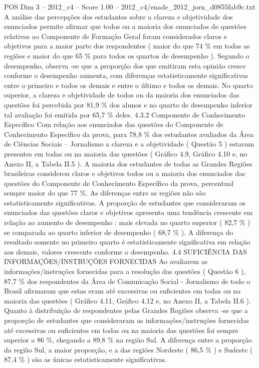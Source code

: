 \begin{textsample}{POS Dim 3 – 2012\_c4 – Score 1.00 – 2012\_c4/enade\_2012\_jorn\_d0855fab9c.txt}
A análise das percepções dos estudantes sobre a clareza e objetividade dos enunciados permite afirmar que todos ou a maioria dos enunciados de questões relativas ao Componente de Formação Geral foram considerados claros e objetivos para a maior parte dos respondentes ( maior do que 74 \% em todas as regiões e maior do que 65 \% para todos os quartos de desempenho ).
Segundo o desempenho, observa -se que a proporção dos que emitiram esta opinião cresce conforme o desempenho aumenta, com diferenças estatisticamente significativas entre o primeiro e todos os demais e entre o último e todos os demais.
No quarto superior, a clareza e objetividade de todos ou da maioria dos enunciados das questões foi percebida por 81,9 \% dos alunos e no quarto de desempenho inferior tal avaliação foi emitida por 65,7 \% deles. 4.3.2 Componente de Conhecimento Específico Com relação aos enunciados das questões do Componente de Conhecimento Específico da prova, para 78,8 \% dos estudantes avaliados da Área de Ciências Sociais – Jornalismo a clareza e a objetividade ( Questão 5 ) estavam presentes em todas ou na maioria das questões ( Gráfico 4.9, Gráfico 4.10 e, no Anexo II, a Tabela II.5 ).
A maioria dos estudantes de todas as Grandes Regiões brasileiras considerou claros e objetivos todos ou a maioria dos enunciados das questões do Componente de Conhecimento Específico da prova, percentual sempre maior do que 77 \%.
As diferenças entre as regiões não são estatisticamente significativas.
A proporção de estudantes que consideraram os enunciados das questões claros e objetivos apresenta uma tendência crescente em relação ao aumento de desempenho : mais elevada no quarto superior ( 82,7 \% ) se comparada ao quarto inferior de desempenho ( 68,7 \% ).
A diferença do resultado somente no primeiro quarto é estatisticamente significativa em relação aos demais, valores crescente conforme o desempenho. 4.4 SUFICIÊNCIA DAS INFORMAÇÕES/INSTRUÇÕES FORNECIDAS Ao avaliarem as informações/instruções fornecidas para a resolução das questões ( Questão 6 ), 87,7 \% dos respondentes da Área de Comunicação Social - Jornalismo de todo o Brasil afirmaram que estas eram até excessivas ou suficientes em todas ou na maioria das questões ( Gráfico 4.11, Gráfico 4.12 e, no Anexo II, a Tabela II.6 ).
Quanto à distribuição de respondentes pelas Grandes Regiões observa -se que a proporção de estudantes que consideraram as informações/instruções fornecidas até excessivas ou suficientes em todas ou na maioria das questões foi sempre superior a 86 \%, chegando a 89,8 \% na região Sul.
A diferença entre a proporção da região Sul, a maior proporção, e a das regiões Nordeste ( 86,5 \% ) e Sudeste ( 87,4 \% ) são as únicas estatisticamente significativas.

\end{textsample}
